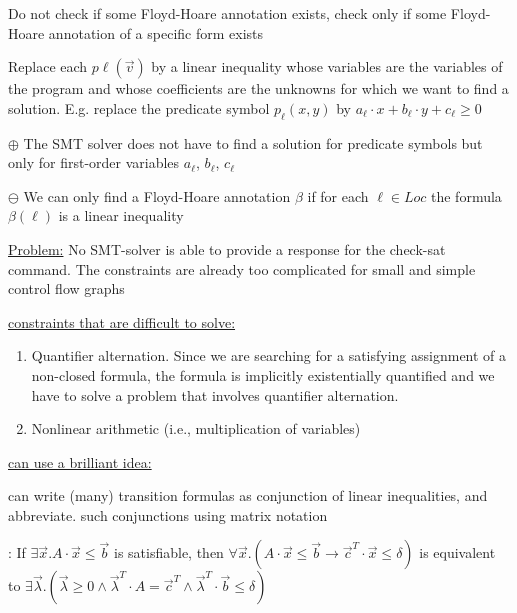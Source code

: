 \documentclass[landscape, a4paper]{article}
\begin{document}
\begin{minipage}[t]{0.2\linewidth}
\begin{betterlist}
\begin{betterlist}
			\item Do not check if some Floyd-Hoare annotation exists, check only if some Floyd-Hoare annotation of a specific form exists
			\item Replace each $p\ell(\vec{v})$ by a linear inequality whose variables are the variables of the program and whose coefficients are the unknowns for which we want to find a solution. E.g. replace the predicate symbol $p_{\ell}(x, y)$ by $a_{\ell} \cdot  x + b_{\ell} \cdot  y + c_{\ell} \geq 0$
			\item $\oplus$ The SMT solver does not have to find a solution for predicate symbols but only for first-order variables $a_{\ell}$, $b_{\ell}$, $c_{\ell}$
			\item $\ominus$ We can only find a Floyd-Hoare annotation $\beta$ if for each $\ell \in Loc$ the formula $\beta (\ell)$ is a linear inequality
		\end{betterlist}
		\item \underline{Problem:} No SMT-solver is able to provide a response for the check-sat command. The constraints are already too complicated for small and simple control flow graphs
		\begin{betterlist}
			\item \underline{constraints that are difficult to solve:}
			\begin{enumerate}
				\item Quantifier alternation. Since we are searching for a satisfying assignment of a non-closed formula, the formula is implicitly existentially quantified and we have to solve a problem that involves quantifier alternation.
				\item Nonlinear arithmetic (i.e., multiplication of variables)
			\end{enumerate}
			\item \underline{can use a brilliant idea:}
			\begin{betterlist}
				\item can write (many) transition formulas as conjunction of linear inequalities, and abbreviate. 
				such conjunctions using matrix notation
      \item \color{orange}: If $\exists\vec{x} . A \cdot \vec{x} \leq\vec{b}$ is satisfiable, then $\forall\vec{x} . (A \cdot \vec{x} \leq\vec{b} \rightarrow\vec{c}^T\cdot \vec{x} \leq \delta)$ is equivalent to $\exists\vec{\lambda} . ( \vec{\lambda} \geq 0 \land\vec{\lambda}^T\cdot A =\vec{c}^T\land\vec{\lambda}^T\cdot \vec{b} \leq \delta)$\color{black}

\end{betterlist}
\end{betterlist}
\end{betterlist}
\end{minipage}
\end{document}
